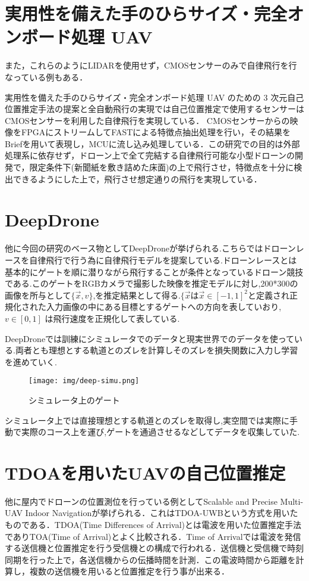 \section{実用性を備えた手のひらサイズ・完全オンボード処理 UAV}
また，これらのようにLIDARを使用せず，CMOSセンサーのみで自律飛行を行なっている例もある．

実用性を備えた手のひらサイズ・完全オンボード処理 UAV のための 3 次元自己位置推定手法の提案と全自動飛行の実現\cite{SfMDrone}では自己位置推定で使用するセンサーはCMOSセンサーを利用した自律飛行を実現している．
CMOSセンサーからの映像をFPGAにストリームしてFAST\cite{FAST}による特徴点抽出処理を行い，その結果をBrief\cite{Brief}を用いて表現し，MCUに流し込み処理している．この研究での目的は外部処理系に依存せず，ドローン上で全て完結する自律飛行可能な小型ドローンの開発で，限定条件下(新聞紙を敷き詰めた床面)の上で飛行させ，特徴点を十分に検出できるようにした上で，飛行させ想定通りの飛行を実現している．

\section{DeepDrone}
他に今回の研究のベース物としてDeepDrone\cite{DeepDrone}が挙げられる.こちらではドローンレースを自律飛行で行う為に自律飛行モデルを提案している.ドローンレースとは基本的にゲートを順に潜りながら飛行することが条件となっているドローン競技である.このゲートをRGBカメラで撮影した映像を推定モデルに対し,200*300の画像を所与として$\lbrace \vec{x}, v \rbrace$,を推定結果として得る.$\lbrace \vec{x}$は$\vec{x} \in [-1,1]^2$と定義され正規化された入力画像の中にある目標とするゲートへの方向を表していおり, $v \in [0,1]$ は飛行速度を正規化して表している. 

DeepDroneでは訓練にシミュレータでのデータと現実世界でのデータを使っている.両者とも理想とする軌道とのズレを計算しそのズレを損失関数に入力し学習を進めていく.
\begin{figure}[htbp]
  \begin{center}
    \texttt{[image: img/deep-simu.png]}
    \caption{シミュレータ上のゲート}
    \label{fig:gate}
  \end{center}
\end{figure}
シミュレータ上では直接理想とする軌道とのズレを取得し,実空間では実際に手動で実際のコース上を運び,ゲートを通過させるなどしてデータを収集していた.

\section{TDOAを用いたUAVの自己位置推定}
他に屋内でドローンの位置測位を行っている例としてScalable and Precise Multi-UAV Indoor Navigation\cite{TDOA-UWB}が挙げられる．これはTDOA-UWBという方式を用いたものである．TDOA(Time Differences of Arrival)とは電波を用いた位置推定手法でありTOA(Time of Arrival)とよく比較される．Time of Arrivalでは電波を発信する送信機と位置推定を行う受信機との構成で行われる．送信機と受信機で時刻同期を行った上で，各送信機からの伝播時間を計測．この電波時間から距離を計算し，複数の送信機を用いると位置推定を行う事が出来る．

